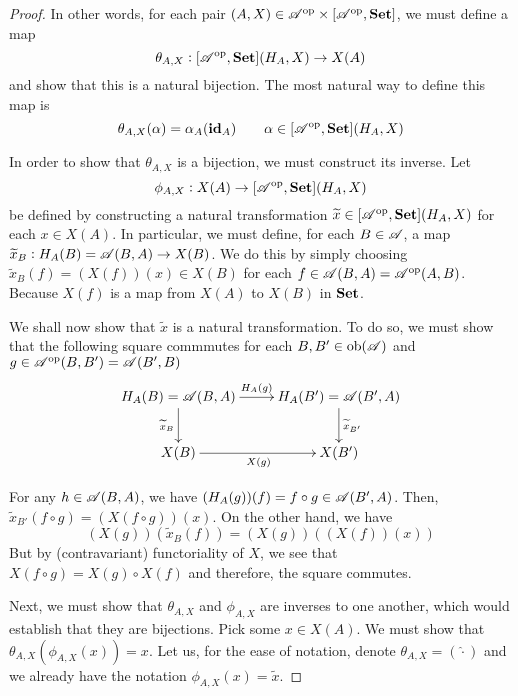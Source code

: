 \begin{proof}
In other words, for each pair $(A,X)\in\mathscr{A}^{\text{op}}\times[\mathscr{A}^{\text{op}},\mathbf{Set}]$, we must define a map 
\begin{equation*}
    \theta_{A,X}:[\mathscr{A}^{\text{op}},\mathbf{Set}](H_A,X)\to X(A)
\end{equation*}
and show that this is a natural bijection. The most natural way to define this map is 
\begin{equation*}
    \theta_{A,X}(\alpha) = \alpha_A(\mathbf{id}_A)\qquad\alpha\in[\mathscr{A}^{\text{op}},\mathbf{Set}](H_A,X)
\end{equation*}

In order to show that $\theta_{A,X}$ is a bijection, we must construct its inverse. Let 
\begin{equation*}
    \phi_{A,X}:X(A)\to[\mathscr{A}^{\text{op}},\mathbf{Set}](H_A,X)
\end{equation*}
be defined by constructing a natural transformation $\widetilde{x}\in[\mathscr{A}^{\text{op}},\mathbf{Set}](H_A,X)$ for each $x\in X(A)$. In particular, we must define, for each $B\in\mathscr{A}$, a map $\widetilde{x}_B: H_A(B) = \mathscr{A}(B,A)\to X(B)$. We do this by simply choosing $\widetilde{x}_B(f) = (X(f))(x)\in X(B)$ for each $f\in\mathscr{A}(B,A) = \mathscr{A}^{\text{op}}(A,B)$. Because $X(f)$ is a map from $X(A)$ to $X(B)$ in $\mathbf{Set}$.

We shall now show that $\widetilde{x}$ is a natural transformation. To do so, we must show that the following square commmutes for each $B,B'\in\operatorname{ob}(\mathscr{A})$ and $g\in\mathscr{A}^{\text{op}}(B,B') = \mathscr{A}(B',B)$
\begin{equation*}
    \xymatrix{
        H_A(B) = \A(B,A)\ar[r]^-{H_A(g)}\ar[d]_-{\widetilde{x}_B} & H_A(B') = \A(B',A)\ar[d]^-{\widetilde{x}_{B'}}\\
        X(B)\ar[r]_{X(g)} & X(B')
    }
\end{equation*}

For any $h\in\mathscr{A}(B,A)$, we have $(H_A(g))(f) = f\circ g\in\mathscr{A}(B',A)$. Then, $\widetilde{x}_{B'}(f\circ g) = (X(f\circ g))(x)$. On the other hand, we have 
\begin{equation*}
    (X(g))(\widetilde{x}_B(f)) = (X(g))((X(f))(x))
\end{equation*}
But by (contravariant) functoriality of $X$, we see that $X(f\circ g) = X(g)\circ X(f)$ and therefore, the square commutes.

Next, we must show that $\theta_{A,X}$ and $\phi_{A,X}$ are inverses to one another, which would establish that they are bijections. Pick some $x\in X(A)$. We must show that $\theta_{A,X}(\phi_{A,X}(x)) = x$. Let us, for the ease of notation, denote $\theta_{A,X} = (\widehat{\cdot})$ and we already have the notation $\phi_{A,X}(x) = \widetilde{x}$.


\end{proof}
